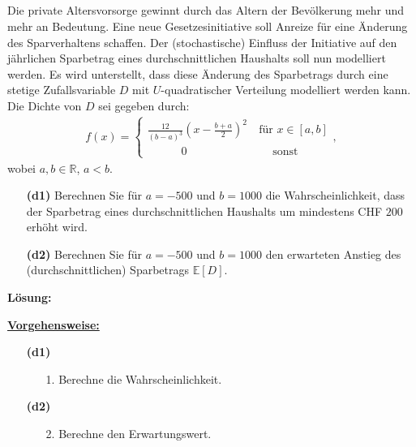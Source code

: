 \newpage
\subsection*{}
Die private Altersvorsorge gewinnt durch das Altern der Bevölkerung mehr und mehr an Bedeutung. Eine neue Gesetzesinitiative soll Anreize für eine Änderung des Sparverhaltens schaffen. Der (stochastische) Einfluss der Initiative auf den jährlichen Sparbetrag eines durchschnittlichen Haushalts soll nun modelliert werden. Es wird unterstellt, dass diese Änderung des Sparbetrags durch eine stetige Zufallsvariable $ D $ mit $ U $-quadratischer Verteilung modelliert werden kann.
Die Dichte von $ D $ sei gegeben durch:
\begin{align*}
	f(x)
	=
	\begin{cases}
		\frac{12}{(b-a)^3} \left(x - \frac{b+a}{2}\right)^2 \ &\textrm{für } x \in [a,b]\\ 
		\qquad \quad 0  \ &\quad \  \textrm{sonst}
	\end{cases},
\end{align*}
wobei $ a,b \in \mathbb{R} $, $ a < b $.
\begin{enumerate}
	\item[\textbf{(d1)}]
	Berechnen Sie für $ a = - 500 $ und $ b = 1000 $ die Wahrscheinlichkeit, dass der Sparbetrag eines durchschnittlichen Haushalts um mindestens CHF $ 200 $ erhöht wird.
	\item[\textbf{(d2)}]
	Berechnen Sie für $ a = - 500 $ und $ b = 1000 $ den erwarteten Anstieg des (durchschnittlichen) Sparbetrags $ \mathbb{E}[D] $.
\end{enumerate}

\textbf{Lösung:}
\begin{mdframed}
\underline{\textbf{Vorgehensweise:}}
\begin{enumerate}
\item[\textbf{(d1)}]
\begin{enumerate}
	\item[1.] Berechne die Wahrscheinlichkeit.
\end{enumerate}
\item[\textbf{(d2)}]
\begin{enumerate}
	\item[2.] Berechne den Erwartungswert.
\end{enumerate}
\end{enumerate}
\end{mdframed}

